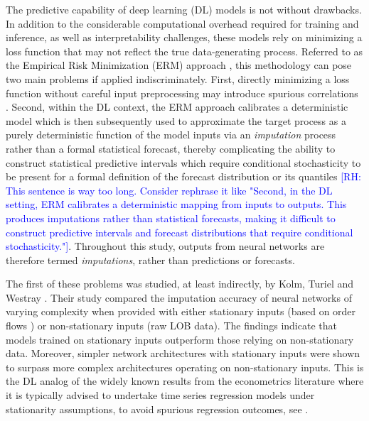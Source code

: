 \documentclass[10pt,a4paper,oneside]{article}
\newcommand{\rh}[1]{\textcolor{blue}{\textsf{[RH: #1]}}}
\providecommand{\DIFdeltex}[1]{{\protect\color{red} \scriptsize #1}} %
\providecommand{\DIFdelbegin}{} %
\providecommand{\DIFdelend}{} %
\providecommand{\DIFdel}[1]{\texorpdfstring{\DIFdeltex{#1}}{}} %
\newcommand{\DIFscaledelfig}{0.5}
\newlength{\DIFdelgraphicswidth} %
\newlength{\DIFdelgraphicsheight} %
\newcommand{\DIFdelincludegraphics}[2][]{%
\sbox{\DIFdelgraphicsbox}{\DIFOincludegraphics[#1]{#2}}%
\settoboxwidth{\DIFdelgraphicswidth}{\DIFdelgraphicsbox} %
\settoboxtotalheight{\DIFdelgraphicsheight}{\DIFdelgraphicsbox} %
\scalebox{\DIFscaledelfig}{%
\parbox[b]{\DIFdelgraphicswidth}{\usebox{\DIFdelgraphicsbox}\\[-\baselineskip] \rule{\DIFdelgraphicswidth}{0em}}\llap{\resizebox{\DIFdelgraphicswidth}{\DIFdelgraphicsheight}{%
\setlength{\unitlength}{\DIFdelgraphicswidth}%
\begin{picture}(1,1)%
\thicklines\linethickness{2pt} %
{\color[rgb]{1,0,0}\put(0,0){\framebox(1,1){}}}%
{\color[rgb]{1,0,0}\put(0,0){\line( 1,1){1}}}%
{\color[rgb]{1,0,0}\put(0,1){\line(1,-1){1}}}%
\end{picture}%
}\hspace*{3pt}}} %
} %
\DeclareRobustCommand{\DIFdelbegin}{\DIFOdelbegin \let\includegraphics\DIFdelincludegraphics} %
\DeclareRobustCommand{\DIFdelend}{\DIFOaddend \let\includegraphics\DIFOincludegraphics} %
\begin{document}
The predictive capability of deep learning (DL) models is not without drawbacks. In addition to the considerable computational overhead required for training and inference, as well as interpretability challenges, these models rely on minimizing a loss function that may not reflect the true data-generating process. Referred to as the Empirical Risk Minimization (ERM) approach \cite{breiman2001statistical}, this methodology can pose two main problems if applied indiscriminately. First, directly minimizing a loss function without careful input preprocessing may introduce spurious correlations \cite{granger1974spurious, phillips1986understanding}. Second, within the DL context, the ERM approach calibrates a deterministic model which is then subsequently used to approximate the target process as a purely deterministic function of the model inputs via an \emph{imputation} process rather than a formal statistical forecast, thereby complicating the ability to construct statistical predictive intervals which require conditional stochasticity to be present for a formal definition of the forecast distribution or its quantiles\DIFdelbegin \DIFdel{\rh{This sentence is way too long. Consider rephrase it like "Second, in the DL setting, ERM calibrates a deterministic mapping from inputs to outputs. This produces imputations rather than statistical forecasts, making it difficult to construct predictive intervals and forecast distributions that require conditional stochasticity."}}\DIFdelend . Throughout this study, outputs from neural networks are therefore termed \emph{imputations}, rather than predictions or forecasts.

The first of these problems was studied, at least indirectly, by Kolm, Turiel and Westray \cite{kolm2023deep}. Their study compared the imputation accuracy of neural networks of varying complexity when provided with either stationary inputs (based on order flows \cite{cont2013price}) or non-stationary inputs (raw LOB data). The findings indicate that models trained on stationary inputs outperform those relying on non-stationary data. Moreover, simpler network architectures with stationary inputs were shown to surpass more complex architectures operating on non-stationary inputs. This is the DL analog of the widely known results from the econometrics literature where it is typically advised to undertake time series regression models under stationarity assumptions, to avoid spurious regression outcomes, see \cite{granger1974spurious, phillips1986understanding, hamilton_time_1994}.
\end{document}
